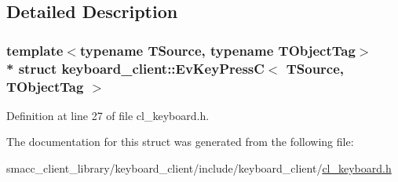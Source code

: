\subsection{Detailed Description}
\subsubsection*{template$<$typename T\+Source, typename T\+Object\+Tag$>$\\*
struct keyboard\+\_\+client\+::\+Ev\+Key\+Press\+C$<$ T\+Source, T\+Object\+Tag $>$}



Definition at line 27 of file cl\+\_\+keyboard.\+h.



The documentation for this struct was generated from the following file\+:\begin{DoxyCompactItemize}
\item 
smacc\+\_\+client\+\_\+library/keyboard\+\_\+client/include/keyboard\+\_\+client/\hyperlink{cl__keyboard_8h}{cl\+\_\+keyboard.\+h}\end{DoxyCompactItemize}
